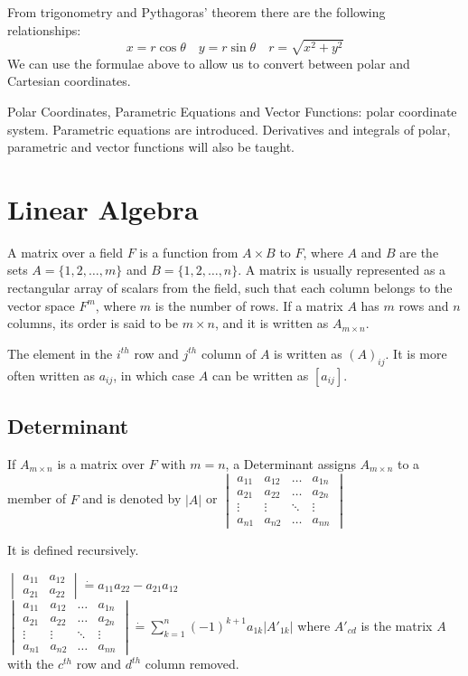 From trigonometry and Pythagoras' theorem there are the following relationships:
\[ x = r\cos\theta \quad y = r\sin\theta \quad r = \sqrt{x^2+y^2} \]
We can use the formulae above to allow us to convert between polar and Cartesian coordinates.

Polar Coordinates, Parametric Equations and Vector Functions: polar coordinate system. Parametric equations are introduced. Derivatives and integrals of polar, parametric and vector functions will also be taught.
\pagebreak

\section{Linear Algebra}

A matrix over a field $F$ is a function from $A\times B$ to $F$, where $A$ and $B$ are the sets $A=\{1,2,\ldots,m\}$ and $B=\{1,2,\ldots,n\}$. A matrix is usually represented as a rectangular array of scalars from the field, such that each column belongs to the vector space $F^m$, where $m$ is the number of rows. If a matrix $A$ has $m$ rows and $n$ columns, its order is said to be $m \times n$, and it is written as $A_{m \times n}$.

The element in the $i^{th}$ row and $j^{th}$ column of $A$ is written as $(A)_{ij}$. It is more often written as $a_{ij}$, in which case $A$ can be written as $[a_{ij}]$.

\subsection{Determinant}
If $A_{m\times n}$ is a matrix over $F$ with $m=n$, a Determinant assigns $A_{m\times n}$ to a member of $F$ and is denoted by $|A|$ or $\begin{vmatrix} a_{11} & a_{12} & \ldots & a_{1n} \\ a_{21} & a_{22} & \ldots & a_{2n} \\ \vdots & \vdots & \ddots & \vdots \\ a_{n1} & a_{n2} & \ldots & a_{nn}\end{vmatrix}$

It is defined recursively.

$\begin{vmatrix} a_{11} & a_{12} \\ a_{21} & a_{22} \end{vmatrix}\dot{=}a_{11} a_{22}-a_{21} a_{12}$ $\begin{vmatrix} a_{11} & a_{12} & \ldots & a_{1n} \\ a_{21} & a_{22} & \ldots & a_{2n} \\ \vdots & \vdots & \ddots & \vdots \\ a_{n1} & a_{n2} & \ldots & a_{nn}\end{vmatrix}\dot{=}\sum_{k=1}^n (-1)^{k+1} a_{1k} |A'_{1k}|$
where $A'_{cd}$ is the matrix $A$ with the $c^{th}$ row and $d^{th}$ column removed.


